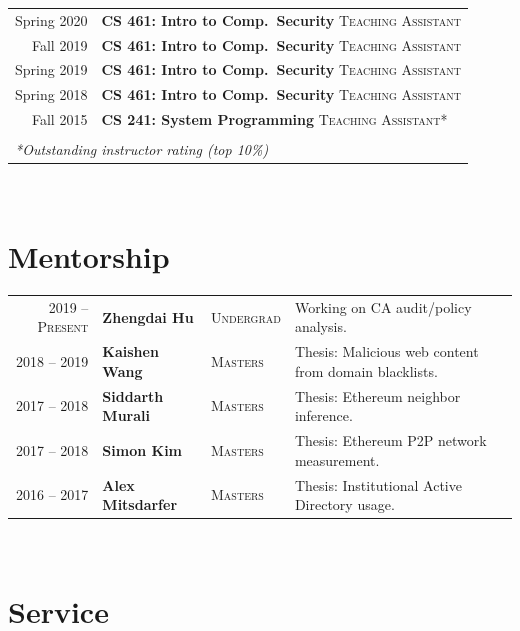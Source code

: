 \documentclass[10pt,singlecolumn]{article} %
\begin{document}
\begin{tabular}{rl}
Spring 2020	 & \textbf{CS 461: Intro to Comp.\ Security} \textsc{Teaching Assistant}\\ 
Fall 2019	 & \textbf{CS 461: Intro to Comp.\ Security} \textsc{Teaching Assistant}\\
Spring 2019	 & \textbf{CS 461: Intro to Comp.\ Security} \textsc{Teaching Assistant}\\  
Spring 2018	 & \textbf{CS 461: Intro to Comp.\ Security} \textsc{Teaching Assistant}\\ 
Fall 2015	 & \textbf{CS 241: System Programming} \textsc{Teaching Assistant*}\\ \\
\multicolumn{2}{l}{\textit{*Outstanding instructor rating (top 10\%)}}
\end{tabular}\\[10pt]



\section{Mentorship} 
\begin{tabular}{rlll}
2019 -- \textsc{Present}	 & \textbf{Zhengdai Hu} & \textsc{Undergrad} & Working on CA audit/policy analysis.\\ 
2018 -- 2019	 & \textbf{Kaishen Wang} & \textsc{Masters} & Thesis: Malicious web content from domain blacklists.\\
2017 -- 2018	 & \textbf{Siddarth Murali} & \textsc{Masters} & Thesis: Ethereum neighbor inference.\\ 
2017 -- 2018	 & \textbf{Simon Kim} & \textsc{Masters} & Thesis: Ethereum P2P network measurement.\\  
2016 -- 2017	 & \textbf{Alex Mitsdarfer} & \textsc{Masters} & Thesis: Institutional Active Directory usage.\\ 
\end{tabular}\\[10pt]




\section{Service}
\end{document}
